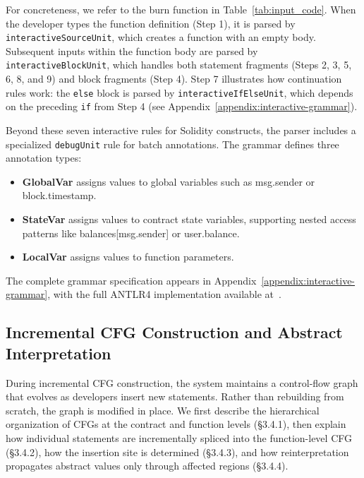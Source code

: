\documentclass[pdflatex,sn-basic]{sn-jnl}%
\theoremstyle{thmstyleone}%
\theoremstyle{thmstyletwo}%
\theoremstyle{thmstylethree}%
\begin{document}
For concreteness, we refer to the burn function in Table~\ref{tab:input_code}.
When the developer types the function definition (Step 1), it is parsed by \texttt{interactiveSourceUnit},
which creates a function with an empty body.
Subsequent inputs within the function body are parsed by \texttt{interactiveBlockUnit},
which handles both statement fragments (Steps 2, 3, 5, 6, 8, and 9) and block fragments (Step 4).
Step 7 illustrates how continuation rules work: the \texttt{else} block is parsed by
\texttt{interactiveIfElseUnit}, which depends on the preceding \texttt{if} from Step 4
(see Appendix~\ref{appendix:interactive-grammar}).

Beyond these seven interactive rules for Solidity constructs, the parser includes
a specialized \texttt{debugUnit} rule for batch annotations.
The grammar defines three annotation types:

\begin{itemize}
  \item \textbf{GlobalVar} assigns values to global variables such as msg.sender or block.timestamp.
  \item \textbf{StateVar} assigns values to contract state variables, supporting nested access patterns like balances[msg.sender] or user.balance.
  \item \textbf{LocalVar} assigns values to function parameters.
\end{itemize}

The complete grammar specification appears in Appendix~\ref{appendix:interactive-grammar},
with the full ANTLR4 implementation available at~\citep{solqrule}.

    \subsection{Incremental CFG Construction and Abstract Interpretation}

During incremental CFG construction, the system maintains a control-flow graph that evolves as developers insert new statements.
Rather than rebuilding from scratch, the graph is modified in place.
We first describe the hierarchical organization of CFGs at the contract and function levels (\S3.4.1),
then explain how individual statements are incrementally spliced into the function-level CFG (\S3.4.2),
how the insertion site is determined (\S3.4.3), and how reinterpretation propagates abstract values
only through affected regions (\S3.4.4).
\end{document}
